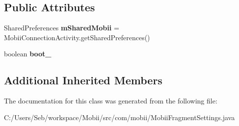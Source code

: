 \subsection*{Public Attributes}
\begin{DoxyCompactItemize}
\item 
\hypertarget{classcom_1_1mobii_1_1_mobii_fragment_settings_a4eefa7f8bcdc2cbdbc432c053065894b}{Shared\-Preferences {\bfseries m\-Shared\-Mobii} = Mobii\-Connection\-Activity.\-get\-Shared\-Preferences()}\label{classcom_1_1mobii_1_1_mobii_fragment_settings_a4eefa7f8bcdc2cbdbc432c053065894b}

\item 
\hypertarget{classcom_1_1mobii_1_1_mobii_fragment_settings_a1ad387ac3b70fa1591cbf4cae1b24422}{boolean {\bfseries boot\-\_\-}}\label{classcom_1_1mobii_1_1_mobii_fragment_settings_a1ad387ac3b70fa1591cbf4cae1b24422}

\end{DoxyCompactItemize}
\subsection*{Additional Inherited Members}


The documentation for this class was generated from the following file\-:\begin{DoxyCompactItemize}
\item 
C\-:/\-Users/\-Seb/workspace/\-Mobii/src/com/mobii/Mobii\-Fragment\-Settings.\-java\end{DoxyCompactItemize}
